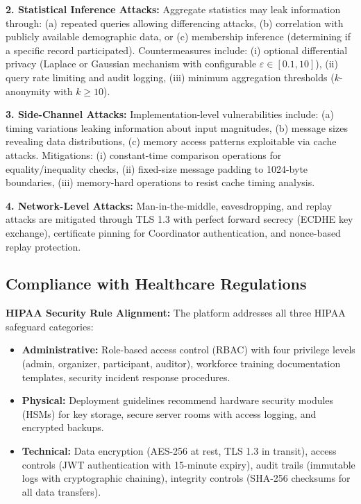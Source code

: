 \documentclass[conference]{IEEEtran}
\begin{document}
\textbf{2. Statistical Inference Attacks:} Aggregate statistics may leak information through: (a) repeated queries allowing differencing attacks, (b) correlation with publicly available demographic data, or (c) membership inference (determining if a specific record participated). Countermeasures include: (i) optional differential privacy (Laplace or Gaussian mechanism with configurable $\varepsilon \in [0.1, 10]$), (ii) query rate limiting and audit logging, (iii) minimum aggregation thresholds ($k$-anonymity with $k \geq 10$).

\textbf{3. Side-Channel Attacks:} Implementation-level vulnerabilities include: (a) timing variations leaking information about input magnitudes, (b) message sizes revealing data distributions, (c) memory access patterns exploitable via cache attacks. Mitigations: (i) constant-time comparison operations for equality/inequality checks, (ii) fixed-size message padding to 1024-byte boundaries, (iii) memory-hard operations to resist cache timing analysis.

\textbf{4. Network-Level Attacks:} Man-in-the-middle, eavesdropping, and replay attacks are mitigated through TLS 1.3 with perfect forward secrecy (ECDHE key exchange), certificate pinning for Coordinator authentication, and nonce-based replay protection.

\subsection{Compliance with Healthcare Regulations}
\textbf{HIPAA Security Rule Alignment:} The platform addresses all three HIPAA safeguard categories:
\begin{itemize}
    \item \textbf{Administrative:} Role-based access control (RBAC) with four privilege levels (admin, organizer, participant, auditor), workforce training documentation templates, security incident response procedures.
    \item \textbf{Physical:} Deployment guidelines recommend hardware security modules (HSMs) for key storage, secure server rooms with access logging, and encrypted backups.
    \item \textbf{Technical:} Data encryption (AES-256 at rest, TLS 1.3 in transit), access controls (JWT authentication with 15-minute expiry), audit trails (immutable logs with cryptographic chaining), integrity controls (SHA-256 checksums for all data transfers).
\end{itemize}
\end{document}
